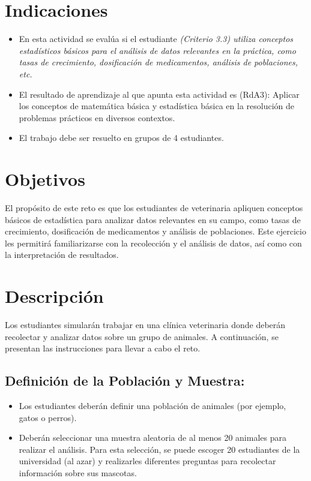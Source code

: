 \documentclass[a4,11pt]{aleph-notas}
\begin{document}
\encabezado

\vspace*{-10mm}
\section*{Indicaciones}
\begin{itemize}[leftmargin=*]
\item 
    En esta actividad se evalúa si el estudiante \textit{(Criterio 3.3) utiliza conceptos estadísticos básicos para el análisis de datos relevantes en la práctica, como tasas de crecimiento, dosificación de medicamentos, análisis de poblaciones, etc.}
\item 
	El resultado de aprendizaje al que apunta esta actividad es (RdA3): Aplicar los conceptos de matemática básica y estadística básica en la resolución de problemas prácticos en diversos contextos.
\item 
	El trabajo debe ser resuelto en grupos de 4 estudiantes.
\end{itemize}

\section{Objetivos}
El propósito de este reto es que los estudiantes de veterinaria apliquen conceptos básicos de estadística para analizar datos relevantes en su campo, como tasas de crecimiento, dosificación de medicamentos y análisis de poblaciones. Este ejercicio les permitirá familiarizarse con la recolección y el análisis de datos, así como con la interpretación de resultados.

\section{Descripción}
Los estudiantes simularán trabajar en una clínica veterinaria donde deberán recolectar y analizar datos sobre un grupo de animales. A continuación, se presentan las instrucciones para llevar a cabo el reto.

\subsection{Definición de la Población y Muestra:}
\begin{itemize}
	\item Los estudiantes deberán definir una población de animales (por ejemplo, gatos o perros).
	\item Deberán seleccionar una muestra aleatoria de al menos 20 animales para realizar el análisis. Para esta selecci\'on, se puede escoger 20 estudiantes de la universidad (al azar) y realizarles diferentes preguntas para recolectar informaci\'on sobre sus mascotas.
\end{itemize}
\end{document}
